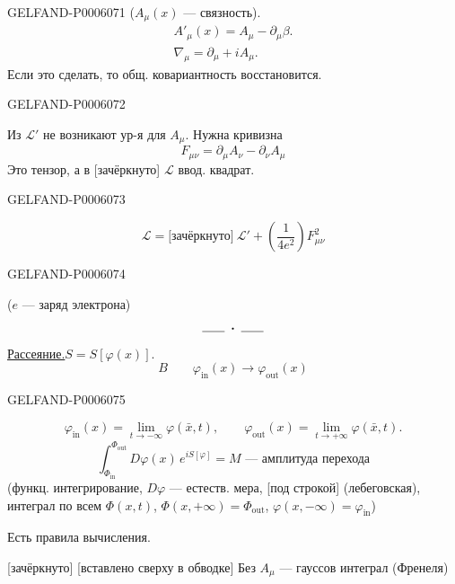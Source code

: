 \begin{GelfandAdjacentEvidence}{GELFAND-P000607}{1}
(\(A_\mu(x)\) — связность).
\[
\begin{gathered}
A'_\mu(x)=A_\mu-\partial_\mu\beta.\\
\nabla_\mu=\partial_\mu+iA_\mu.
\end{gathered}
\]
Если это сделать, то общ. ковариантность восстановится.
\end{GelfandAdjacentEvidence}
\begin{GelfandAdjacentEvidence}{GELFAND-P000607}{2}


Из \(\mathcal L'\) не возникают ур-я для \(A_\mu\). Нужна кривизна
\[
F_{\mu\nu}=\partial_\mu A_\nu-\partial_\nu A_\mu
\]
Это тензор, а в [зачёркнуто] \(\mathcal L\) ввод. квадрат.
\end{GelfandAdjacentEvidence}
\begin{GelfandAdjacentEvidence}{GELFAND-P000607}{3}

\[
\mathcal L=\text{[зачёркнуто]}\ \mathcal L'+\left(\frac1{4e^2}\right)F_{\mu\nu}^2
\]
\end{GelfandAdjacentEvidence}
\begin{GelfandAdjacentEvidence}{GELFAND-P000607}{4}

(\(e\) — заряд электрона)
\[
\rule{1.8em}{.4pt}\;\boldsymbol{\cdot}\;\rule{1.8em}{.4pt}
\]
\underline{Рассеяние.}\qquad \(S=S[\varphi(x)]\).
\[
B\qquad \varphi_{\mathrm{in}}(x)\longrightarrow\varphi_{\mathrm{out}}(x)
\]
\end{GelfandAdjacentEvidence}
\begin{GelfandAdjacentEvidence}{GELFAND-P000607}{5}

\[
\varphi_{\mathrm{in}}(x)=\lim_{t\to-\infty}\varphi(\bar x,t),\qquad
\varphi_{\mathrm{out}}(x)=\lim_{t\to+\infty}\varphi(\bar x,t).
\]
\[
\int_{\Phi_{\mathrm{in}}}^{\Phi_{\mathrm{out}}}D\varphi(x)\,e^{iS[\varphi]}
=M\text{ — амплитуда перехода}
\]
(функц. интегрирование, \(D\varphi\) — естеств. мера, [под строкой] (лебеговская),
интеграл по всем \(\Phi(x,t)\),
\(\Phi(x,+\infty)=\Phi_{\mathrm{out}}\),
\(\varphi(x,-\infty)=\varphi_{\mathrm{in}}\))

Есть правила вычисления.

[зачёркнуто] [вставлено сверху в обводке] Без \(A_\mu\) — гауссов интеграл (Френеля)
\end{GelfandAdjacentEvidence}
